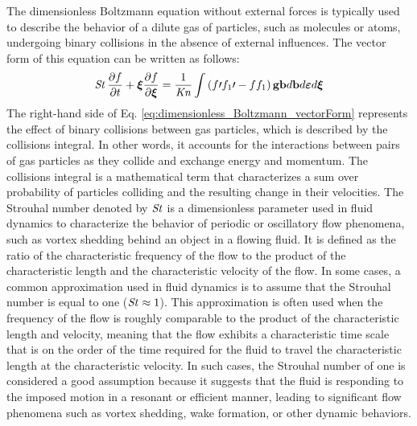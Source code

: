 The dimensionless Boltzmann equation without external forces is typically used to describe the behavior of a dilute gas of particles, such as molecules or atoms, undergoing binary collisions in the absence of external influences. The vector form of this equation can be written as follows\cite{kogan1969rarefied}:
\begin{equation} \label{eq:dimensionless_Boltzmann_vectorForm}
    \operatorname{\mathit{S\kern-.11em t}}\frac{\partial f}{\partial t} +\boldsymbol{\xi}\frac{\partial f}{\partial \boldsymbol{\xi}}
    =
    \frac{1}{\operatorname{\mathit{K\kern-.11em n}}}\int \left(f\prime f_1\prime-ff_1\right)\mathbf{g b}d\mathbf{b} d\boldsymbol{\varepsilon} d\boldsymbol{\xi}
\end{equation}
The right-hand side of Eq. \ref{eq:dimensionless_Boltzmann_vectorForm} represents the effect of binary collisions between gas particles, which is described by the collisions integral. In other words, it accounts for the interactions between pairs of gas particles as they collide and exchange energy and momentum. The collisions integral is a mathematical term that characterizes a sum over probability of particles colliding and the resulting change in their velocities. The Strouhal number denoted by $\operatorname{\mathit{S\kern-.11em t}}$ is a dimensionless parameter used in fluid dynamics to characterize the behavior of periodic or oscillatory flow phenomena, such as vortex shedding behind an object in a flowing fluid. It is defined as the ratio of the characteristic frequency of the flow to the product of the characteristic length and the characteristic velocity of the flow. In some cases, a common approximation used in fluid dynamics is to assume that the Strouhal number is equal to one ($\operatorname{\mathit{S\kern-.11em t}}\approx 1$). This approximation is often used when the frequency of the flow is roughly comparable to the product of the characteristic length and velocity, meaning that the flow exhibits a characteristic time scale that is on the order of the time required for the fluid to travel the characteristic length at the characteristic velocity. In such cases, the Strouhal number of one is considered a good assumption because it suggests that the fluid is responding to the imposed motion in a resonant or efficient manner, leading to significant flow phenomena such as vortex shedding, wake formation, or other dynamic behaviors.


